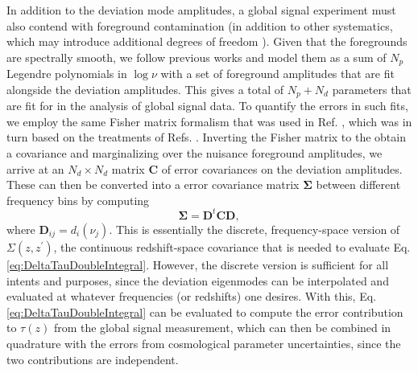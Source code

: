 \documentclass[twocolumn,aps,prd,nofootinbib,showpacs,superscriptaddress]{revtex4-1}
\begin{document}
In addition to the deviation mode amplitudes, a global signal experiment must also contend with foreground contamination (in addition to other systematics, which may introduce additional degrees of freedom \cite{switzer_and_liu2014}). Given that the foregrounds are spectrally smooth, we follow previous works \cite{mcquinn_et_al2006} and model them as a sum of $N_p$ Legendre polynomials in $\log \nu$ with a set of foreground amplitudes that are fit alongside the deviation amplitudes. This gives a total of $N_p + N_d$ parameters that are fit for in the analysis of global signal data. To quantify the errors in such fits, we employ the same Fisher matrix formalism that was used in Ref. \cite{presley_et_al2015}, which was in turn based on the treatments of Refs. \cite{pritchard_and_loeb2010,bernardi_et_al2015}. Inverting the Fisher matrix to the obtain a covariance and marginalizing over the nuisance foreground amplitudes, we arrive at an $N_d \times N_d$ matrix $\mathbf{C}$ of error covariances on the deviation amplitudes. These can then be converted into a error covariance matrix $\boldsymbol \Sigma$ between different frequency bins by computing
\begin{equation}
\boldsymbol \Sigma = \mathbf{D}^t \mathbf{C} \mathbf{D},
\end{equation}
where $\mathbf{D}_{ij} = d_i (\nu_j) $. This is essentially the discrete, frequency-space version of $\Sigma ( z, z^\prime)$, the continuous redshift-space covariance that is needed to evaluate Eq. \eqref{eq:DeltaTauDoubleIntegral}. However, the discrete version is sufficient for all intents and purposes, since the deviation eigenmodes can be interpolated and evaluated at whatever frequencies (or redshifts) one desires. With this, Eq. \eqref{eq:DeltaTauDoubleIntegral} can be evaluated to compute the error contribution to $\tau(z)$ from the global signal measurement, which can then be combined in quadrature with the errors from cosmological parameter uncertainties, since the two contributions are independent.
\end{document}
